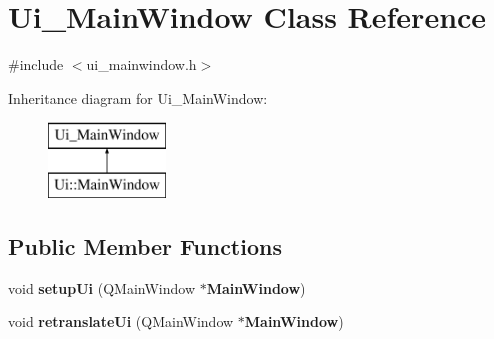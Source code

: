 \section{Ui\-\_\-\-Main\-Window Class Reference}
\label{class_ui___main_window}


{\ttfamily \#include $<$ui\-\_\-mainwindow.\-h$>$}

Inheritance diagram for Ui\-\_\-\-Main\-Window\-:\begin{figure}[H]
\begin{center}
\leavevmode
\includegraphics[height=2.000000cm]{class_ui___main_window}
\end{center}
\end{figure}
\subsection*{Public Member Functions}
\begin{DoxyCompactItemize}
\item 
void {\bf setup\-Ui} (Q\-Main\-Window $\ast${\bf Main\-Window})
\item 
void {\bf retranslate\-Ui} (Q\-Main\-Window $\ast${\bf Main\-Window})
\end{DoxyCompactItemize}
